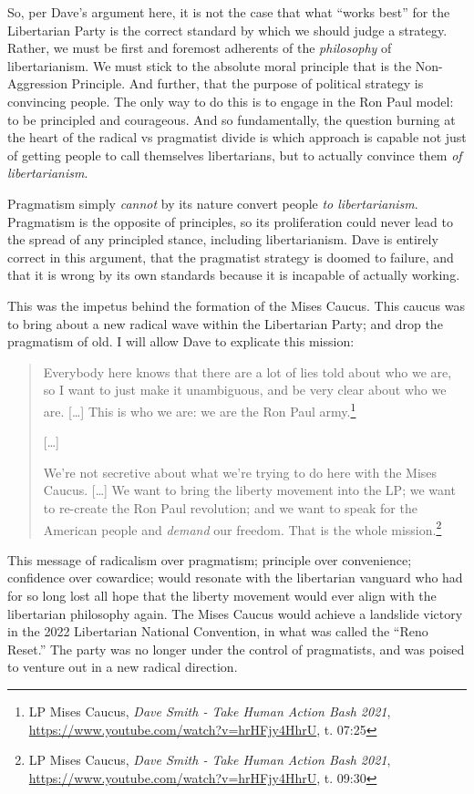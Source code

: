 \documentclass[11pt]{article}
\begin{document}
So, per Dave's argument here, it is not the case that what ``works best'' for the Libertarian Party is the correct standard by which we should judge a strategy. Rather, we must be first and foremost adherents of the \emph{philosophy} of libertarianism. We must stick to the absolute moral principle that is the Non-Aggression Principle. And further, that the purpose of political strategy is convincing people. The only way to do this is to engage in the Ron Paul model: to be principled and courageous. And so fundamentally, the question burning at the heart of the radical vs pragmatist divide is which approach is capable not just of getting people to call themselves libertarians, but to actually convince them \emph{of libertarianism}.

Pragmatism simply \emph{cannot} by its nature convert people \emph{to libertarianism}. Pragmatism is the opposite of principles, so its proliferation could never lead to the spread of any principled stance, including libertarianism. Dave is entirely correct in this argument, that the pragmatist strategy is doomed to failure, and that it is wrong by its own standards because it is incapable of actually working.

This was the impetus behind the formation of the Mises Caucus. This caucus was to bring about a new radical wave within the Libertarian Party; and drop the pragmatism of old. I will allow Dave to explicate this mission:
\begin{quote}
Everybody here knows that there are a lot of lies told about who we are, so I want to just make it unambiguous, and be very clear about who we are. [\ldots{}] This is who we are: we are the Ron Paul army.\footnote{LP Mises Caucus, \emph{Dave Smith - Take Human Action Bash 2021}, \url{https://www.youtube.com/watch?v=hrHFjy4HhrU}, t. 07:25}

{[}\ldots{}]

We're not secretive about what we're trying to do here with the Mises Caucus. [\ldots{}] We want to bring the liberty movement into the LP; we want to re-create the Ron Paul revolution; and we want to speak for the American people and \emph{demand} our freedom. That is the whole mission.\footnote{LP Mises Caucus, \emph{Dave Smith - Take Human Action Bash 2021}, \url{https://www.youtube.com/watch?v=hrHFjy4HhrU}, t. 09:30}
\end{quote}

This message of radicalism over pragmatism; principle over convenience; confidence over cowardice; would resonate with the libertarian vanguard who had for so long lost all hope that the liberty movement would ever align with the libertarian philosophy again. The Mises Caucus would achieve a landslide victory in the 2022 Libertarian National Convention, in what was called the ``Reno Reset.'' The party was no longer under the control of pragmatists, and was poised to venture out in a new radical direction.
\end{document}
